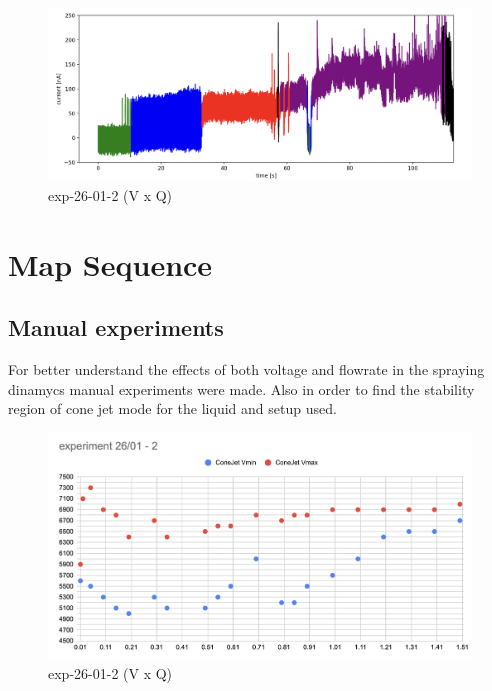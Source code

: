 \begin{figure}[H]
    \center
    \includegraphics[width=12cm]{Figuras/19:03/classified-data-example.png}
    \caption{ exp-26-01-2 (V x Q)}
\end{figure}


\section{Map Sequence}
\label{sec:map_results}



\subsection{Manual experiments}


For better understand the effects of both voltage and flowrate in the spraying dinamycs manual experiments were made.
Also in order to find the stability region of cone jet mode for the liquid and setup used.



\begin{figure}[H]
    \center
    \includegraphics[width=12cm]{Figuras/report3/exp26-01-2.png}
    \caption{ exp-26-01-2 (V x Q)}
\end{figure}


